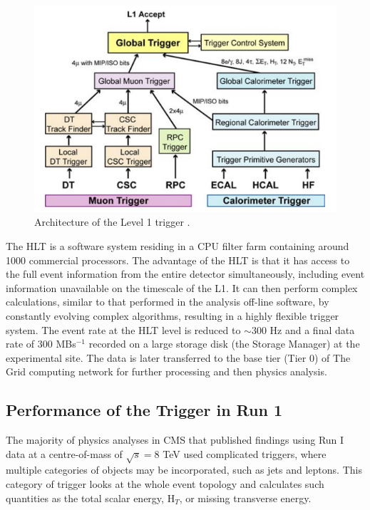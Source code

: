 \begin{figure} \label{fig-L1Trigger}
\begin{center}
\includegraphics[scale=0.5]{Figures/L1Trigger.png}
\caption{Architecture of the Level 1 trigger \cite{CMSexperiment}.}
\end{center}
\end{figure}

The HLT is a software system residing in a CPU filter farm containing around 1000 commercial processors. The advantage of the HLT is that it has access to the full event information from the entire detector simultaneously, including event information unavailable on the timescale of the L1. It can then perform complex calculations, similar to that performed in the analysis off-line software, by constantly evolving complex algorithms, resulting in a highly flexible trigger system. The event rate at the HLT level is reduced to $\sim300$ Hz and a final data rate of $300$ MBs$^{-1}$ recorded on a large storage disk (the Storage Manager) at the experimental site. The data is later transferred to the base tier (Tier 0) of The Grid computing network for further processing and then physics analysis.

\subsection{Performance of the Trigger in Run 1} \label{subsec-TriggerPerformance}

The majority of physics analyses in CMS that published findings using Run I data at a centre-of-mass of $\sqrt{s}=8$ TeV used complicated triggers, where multiple categories of objects may be incorporated, such as jets and leptons. This category of trigger looks at the whole event topology and calculates such quantities as the total scalar energy, H$_T$, or missing transverse energy. 

